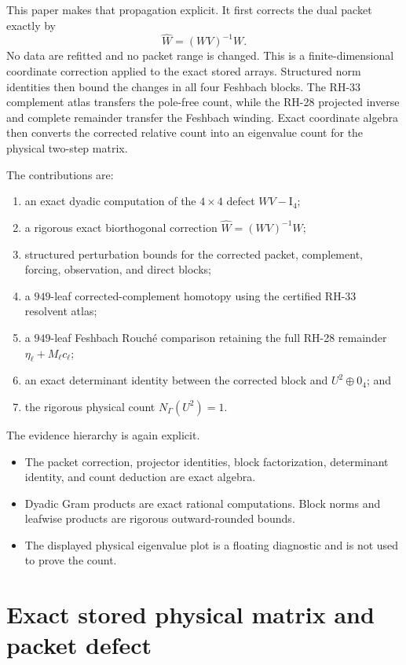 \documentclass[11pt]{article}
\theoremstyle{definition}
\theoremstyle{remark}
\newcommand{\Id}{\mathrm I}
\begin{document}
This paper makes that propagation explicit.  It first corrects the dual
packet exactly by
\[
 \widehat W=(WV)^{-1}W.
\]
No data are refitted and no packet range is changed.  This is a
finite-dimensional coordinate correction applied to the exact stored
arrays.  Structured norm identities then bound the changes in all four
Feshbach blocks.  The RH-33 complement atlas transfers the pole-free count,
while the RH-28 projected inverse and complete remainder transfer the
Feshbach winding.  Exact coordinate algebra then converts the corrected
relative count into an eigenvalue count for the physical two-step matrix.

The contributions are:

\begin{enumerate}
 \item an exact dyadic computation of the \(4\times4\) defect \(WV-\Id_4\);
 \item a rigorous exact biorthogonal correction
       \(\widehat W=(WV)^{-1}W\);
 \item structured perturbation bounds for the corrected packet,
       complement, forcing, observation, and direct blocks;
 \item a \(949\)-leaf corrected-complement homotopy using the certified
       RH-33 resolvent atlas;
 \item a \(949\)-leaf Feshbach Rouch\'e comparison retaining the full
       RH-28 remainder \(\eta_\ell+M_\ell c_\ell\);
 \item an exact determinant identity between the corrected block and
       \(U^2\oplus0_4\); and
 \item the rigorous physical count \(N_\Gamma(U^2)=1\).
\end{enumerate}

The evidence hierarchy is again explicit.

\begin{itemize}
 \item The packet correction, projector identities, block factorization,
       determinant identity, and count deduction are exact algebra.
 \item Dyadic Gram products are exact rational computations.  Block norms
       and leafwise products are rigorous outward-rounded bounds.
 \item The displayed physical eigenvalue plot is a floating diagnostic and
       is not used to prove the count.
\end{itemize}

\section{Exact stored physical matrix and packet defect}
\label{sec:model}
\end{document}
